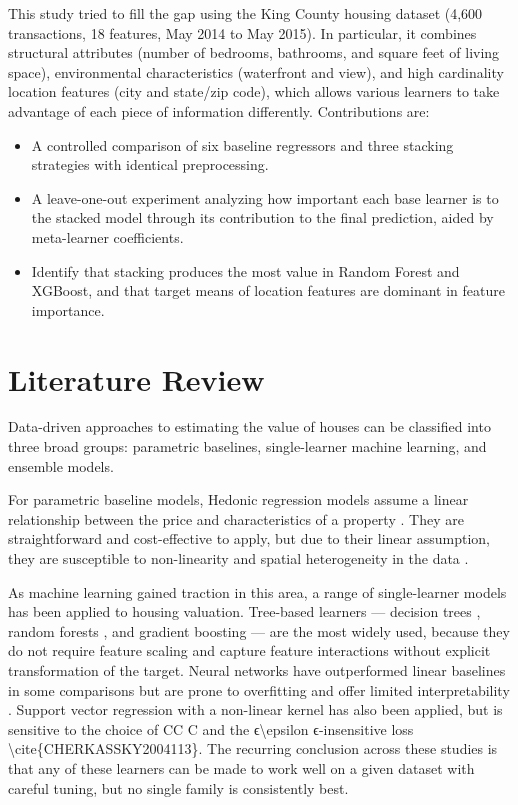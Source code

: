 \documentclass[conference]{IEEEtran}
\begin{document}
This study tried to fill the gap using the King County housing dataset (4,600 transactions, 18 features, May 2014 to May 2015). In particular, it combines structural attributes (number of bedrooms, bathrooms, and square feet of living space), environmental characteristics (waterfront and view), and high cardinality location features (city and state/zip code), which allows various learners to take advantage of each piece of information differently. Contributions are:
\begin{itemize}
    \item A controlled comparison of six baseline regressors and three stacking strategies with identical preprocessing.
    \item A leave-one-out experiment analyzing how important each base learner is to the stacked model through its contribution to the final prediction, aided by meta-learner coefficients.
    \item  Identify that stacking produces the most value in Random Forest and XGBoost, and that target means of location features are dominant in feature importance. 
\end{itemize}

\section{Literature Review}
Data-driven approaches to estimating the value of houses can be classified into three broad groups: parametric baselines, single-learner machine learning, and ensemble models. 

For parametric baseline models, Hedonic regression models assume a linear relationship between the price and characteristics of a property  \cite{KOK2014136}. They are straightforward and cost-effective to apply, but due to their linear assumption, they are susceptible to non-linearity and spatial heterogeneity in the data \cite{SELIM20092843,limsombunchao2004house}.

As machine learning gained traction in this area, a range of single-learner models has been applied to housing valuation. Tree-based learners — decision trees \cite{fan2006determinants}, random forests \cite{10.1023/A:1010933404324}, and gradient boosting \cite{hjort2022house,10.1214/aos/1013203451} — are the most widely used, because they do not require feature scaling and capture feature interactions without explicit transformation of the target. Neural networks have outperformed linear baselines in some comparisons \cite{SELIM20092843} but are prone to overfitting and offer limited interpretability \cite{limsombunchao2004house}. Support vector regression with a non-linear kernel has also been applied, but is sensitive to the choice of CC C and the ϵ\textbackslash{}epsilon ϵ-insensitive loss \textbackslash{}cite\{CHERKASSKY2004113\}. The recurring conclusion across these studies is that any of these learners can be made to work well on a given dataset with careful tuning, but no single family is consistently best.
\end{document}

